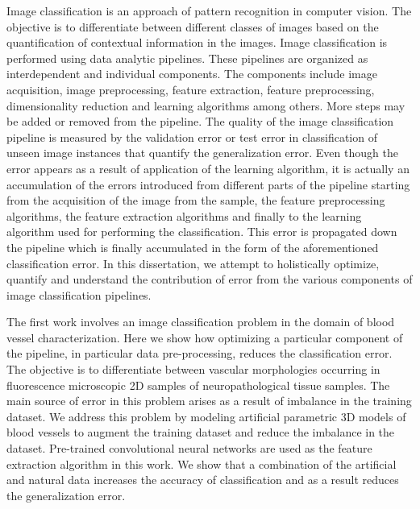 
Image classification is an approach of pattern recognition in computer vision. The objective is to differentiate between different classes of images based on the quantification of contextual information in the images. Image classification is performed using data analytic pipelines. These pipelines are organized as interdependent and individual components. The components include image acquisition, image preprocessing, feature extraction, feature preprocessing, dimensionality reduction and learning algorithms among others. More steps may be added or removed from the pipeline. The quality of the image classification pipeline is measured by the validation error or test error in classification of unseen image instances that quantify the generalization error. Even though the error appears as a result of application of the learning algorithm, it is actually an accumulation of the errors introduced from different parts of the pipeline starting from the acquisition of the image from the sample, the feature preprocessing algorithms, the feature extraction algorithms and finally to the learning algorithm used for performing the  classification. This error is propagated down the pipeline which is finally accumulated in the form of the aforementioned classification error. In this dissertation, we attempt to holistically optimize, quantify and understand the contribution of error from the various components of image classification pipelines.   


The first work involves an image classification problem in the domain of blood vessel characterization. Here we show how optimizing a particular component of the pipeline, in particular data pre-processing, reduces the classification error. The objective is to differentiate between vascular morphologies occurring in fluorescence microscopic 2D samples of neuropathological tissue samples. The main source of error in this problem arises as a result of imbalance in the training dataset. We address this problem by modeling artificial parametric 3D models of blood vessels to augment the training dataset and reduce the imbalance in the dataset. Pre-trained convolutional neural networks are used as the feature extraction algorithm in this work. We show that a combination of the artificial and natural data increases the accuracy of classification and as a result reduces the generalization error.

